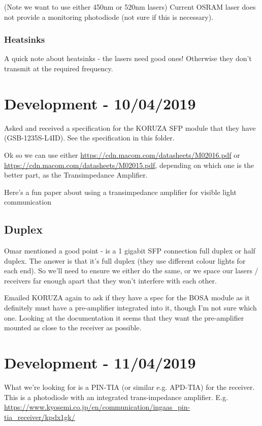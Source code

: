 (Note we want to use either 450nm or 520nm lasers)
Current OSRAM laser does not provide a monitoring photodiode (not sure if
this is necessary).

\subsubsection{Heatsinks}
A quick note about heatsinks - the lasers need good ones! Otherwise they don't
transmit at the required frequency.

\section{Development - 10/04/2019}
Asked and received a specification for the KORUZA \ac{SFP} module that they
have (GSB-1235S-L4ID). See the specification in this folder.

Ok so we can use either \url{https://cdn.macom.com/datasheets/M02016.pdf} or
\url{https://cdn.macom.com/datasheets/M02015.pdf}, depending on which one
is the better part, as the Transimpedance Amplifier.

Here's a fun paper about using a transimpedance amplifier for visible light communication \cite{fuada_putra_aska_adiono_2016}

\subsection{Duplex}
Omar mentioned a good point - is a 1 gigabit SFP connection full duplex or half
duplex. The answer is that it's full duplex (they use different colour lights
for each end). So we'll need to ensure we either do the same, or we space our
lasers / receivers far enough apart that they won't interfere with each other.

Emailed KORUZA again to ask if they have a spec for the \ac{BOSA} module as it
definitely must have a pre-amplifier integrated into it, though I'm not sure
which one. Looking at the documentation it seems that they want the
pre-amplifier mounted as close to the receiver as possible.

\section{Development - 11/04/2019}
What we're looking for is a PIN-TIA (or similar e.g. APD-TIA) for the receiver.
This is a photodiode with an integrated trans-impedance amplifier.
E.g. \url{https://www.kyosemi.co.jp/en/communication/ingaas_pin-tia_receiver/kpdx1gk/}

